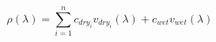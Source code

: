 \documentclass[twoside,10pt]{report}
\begin{document}
\begin{equation}
    \rho(\lambda) = \sum_{i=1}^{n} c_{dry_{i}}v_{dry_{i}}(\lambda)+c_{wet}v_{wet}(\lambda)
    \label{eq:GSV_spectral_vectors}
\end{equation}



\end{document}
